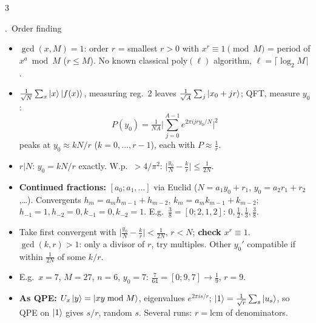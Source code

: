\documentclass[8pt,a4paper]{extarticle}
\newcounter{sec}\newcounter{ssec}[sec]
\newcommand{\sect}[1]{\stepcounter{sec}\par\vspace{2pt}\noindent\colorbox{hd}{\parbox{\dimexpr\linewidth-2\fboxsep}{\color{white}\bfseries\strut\arabic{sec}.\ #1}}\par\vspace{0.5pt}}
\begin{document}
\begin{multicols}{3}
\sect{Order finding}
\begin{itemize}
\item $\gcd(x,M)=1$: order $r$ = smallest $r>0$ with $x^r\equiv1\pmod M$ = period of $x^a\bmod M$ ($r\le M$). No known classical poly$(\ell)$ algorithm, $\ell=\lceil\log_2M\rceil$.
\item $\frac1{\sqrt N}\sum_x\ket x\ket{f(x)}$, measuring reg.\ 2 leaves $\frac1{\sqrt A}\sum_j\ket{x_0+jr}$; QFT, measure $y_0$:
\[P(y_0)=\tfrac1{NA}\Big|\textstyle\sum_{j=0}^{A-1}e^{2\pi ijry_0/N}\Big|^2\]
peaks at $y_0\approx kN/r$ ($k=0,\dots,r{-}1$), each with $P\approx\frac1r$.
\item $r|N$: $y_0=kN/r$ exactly. W.p.\ $>4/\pi^2$: $\big|\frac{y_0}N-\frac kr\big|\le\frac1{2N}$.
\item \textbf{Continued fractions:} $[a_0;a_1,\dots]$ via Euclid ($N=a_1y_0+r_1$, $y_0=a_2r_1+r_2$,\dots). Convergents $h_m=a_mh_{m-1}+h_{m-2}$, $k_m=a_mk_{m-1}+k_{m-2}$; $h_{-1}=1,h_{-2}=0,k_{-1}=0,k_{-2}=1$. E.g.\ $\frac38=[0;2,1,2]$: $0,\frac12,\frac13,\frac38$.
\item Take first convergent with $\big|\frac{y_0}N-\frac kr\big|<\frac1{2N}$, $r<N$; \textbf{check $x^r\equiv1$}. $\gcd(k,r)>1$: only a divisor of $r$, try multiples. Other $y_0'$ compatible if within $\frac1{2N}$ of some $k/r$.
\item E.g.\ $x=7$, $M=27$, $n=6$, $y_0=7$: $\frac7{64}=[0;9,7]\to\frac19$, $r=9$.
\item \textbf{As QPE:} $U_x\ket y=\ket{xy\bmod M}$, eigenvalues $e^{2\pi is/r}$; $\ket1=\frac1{\sqrt r}\sum_s\ket{u_s}$, so QPE on $\ket1$ gives $s/r$, random $s$. Several runs: $r=\mathrm{lcm}$ of denominators.
\end{itemize}


\end{multicols}
\end{document}
